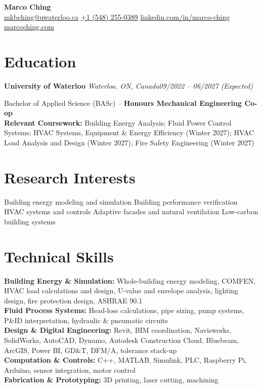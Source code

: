 \documentclass[letterpaper,10pt]{article}
\newcommand{\heading}[2]{\par\vspace{5pt}#1\hfill#2\par}
\begin{document}
\begin{center}
  {\LARGE\bfseries Marco Ching}\\[3pt]
  \href{mailto:mkbching@uwaterloo.ca}{mkbching@uwaterloo.ca} \textbar{}
  \href{tel:+15482550389}{+1 (548) 255-0389} \textbar{}
  \href{https://linkedin.com/in/marco-ching}{linkedin.com/in/marco-ching} \textbar{}
  \href{https://marcoching.com}{marcoching.com}
\end{center}

\section{Education}
\heading{\textbf{University of Waterloo} \textbar{} \textit{Waterloo, ON, Canada}}{\textit{09/2022 -- 06/2027 (Expected)}}
Bachelor of Applied Science (BASc) -- \textbf{Honours Mechanical Engineering Co-op}\\
\textbf{Relevant Coursework:} Building Energy Analysis; Fluid Power Control Systems; HVAC Systems, Equipment \& Energy Efficiency (Winter 2027); HVAC Load Analysis and Design (Winter 2027); Fire Safety Engineering (Winter 2027)

\section{Research Interests}
Building energy modeling and simulation \textbar{} Building performance verification \textbar{} HVAC systems and controls \textbar{} Adaptive facades and natural ventilation \textbar{} Low-carbon building systems

\section{Technical Skills}
\textbf{Building Energy \& Simulation:} Whole-building energy modeling, COMFEN, HVAC load calculations and design, U-value and envelope analysis, lighting design, fire protection design, ASHRAE 90.1\\
\textbf{Fluid Process Systems:} Head-loss calculations, pipe sizing, pump systems, P\&ID interpretation, hydraulic \& pneumatic circuits\\
\textbf{Design \& Digital Engineering:} Revit, BIM coordination, Navisworks, SolidWorks, AutoCAD, Dynamo, Autodesk Construction Cloud, Bluebeam, ArcGIS, Power BI, GD\&T, DFM/A, tolerance stack-up\\
\textbf{Computation \& Controls:} C++, MATLAB, Simulink, PLC, Raspberry Pi, Arduino, sensor integration, motor control\\
\textbf{Fabrication \& Prototyping:} 3D printing, laser cutting, machining
\end{document}
